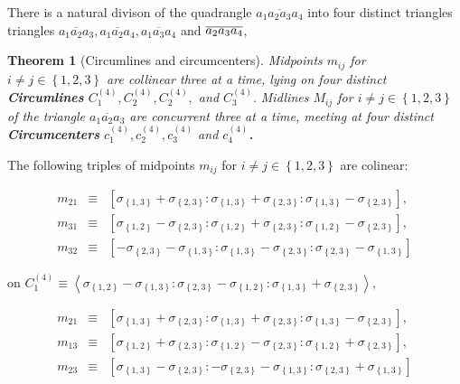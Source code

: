 \documentclass[11pt]{article}
\newtheorem{theorem}{Theorem}
\begin{document}
There is a natural divison of the quadrangle $\overline{a_{1}a_{2}a_{3}a_{4}}
$ into four distinct triangles triangles $\overline{a_{1}a_{2}a_{3}},%
\overline{a_{1}a_{2}a_{4}},\overline{a_{1}a_{3}a_{4}}$ and $\overline{%
a_{2}a_{3}a_{4}}$,

\begin{theorem}[Circumlines and circumcenters]
Midpoints $m_{ij}$ for $i\neq j\in \left\{ 1,2,3\right\} $ are collinear
three at a time, lying on four distinct \textbf{Circumlines} $C_{1}^{\left(
4\right) },C_{2}^{\left( 4\right) },C_{2}^{\left( 4\right) },$ and $%
C_{3}^{\left( 4\right) }.$ Midlines $M_{ij}$ for $i\neq j\in \left\{
1,2,3\right\} $ of the triangle $\overline{a_{1}a_{2}a_{3}}$ are concurrent
three at a time, meeting at four distinct \textbf{Circumcenters} $%
c_{1}^{\left( 4\right) },c_{2}^{\left( 4\right) },c_{3}^{\left( 4\right) }$
and $c_{4}^{\left( 4\right) }$\textbf{.}
\end{theorem}

The following triples of midpoints $m_{ij}$ for $i\neq j\in \left\{
1,2,3\right\} $ are colinear:

\begin{eqnarray*}
m_{21} &\equiv &\left[ \sigma _{\left\{ 1,3\right\} }+\sigma _{\left\{
2,3\right\} }:\sigma _{\left\{ 1,3\right\} }+\sigma _{\left\{ 2,3\right\}
}:\sigma _{\left\{ 1,3\right\} }-\sigma _{\left\{ 2,3\right\} }\right] , \\
m_{31} &\equiv &\left[ \sigma _{\left\{ 1,2\right\} }-\sigma _{\left\{
2,3\right\} }:\sigma _{\left\{ 1,2\right\} }+\sigma _{\left\{ 2,3\right\}
}:\sigma _{\left\{ 1,2\right\} }-\sigma _{\left\{ 2,3\right\} }\right] , \\
m_{32} &\equiv &\left[ -\sigma _{\left\{ 2,3\right\} }-\sigma _{\left\{
1,3\right\} }:\sigma _{\left\{ 1,3\right\} }-\sigma _{\left\{ 2,3\right\}
}:\sigma _{\left\{ 2,3\right\} }-\sigma _{\left\{ 1,3\right\} }\right] 
\end{eqnarray*}

on $C_{1}^{\left( 4\right) }\equiv \left\langle \sigma _{\left\{ 1,2\right\}
}-\sigma _{\left\{ 1,3\right\} }:\sigma _{\left\{ 2,3\right\} }-\sigma
_{\left\{ 1,2\right\} }:\sigma _{\left\{ 1,3\right\} }+\sigma _{\left\{
2,3\right\} }\right\rangle ,$

\begin{eqnarray*}
m_{21} &\equiv &\left[ \sigma _{\left\{ 1,3\right\} }+\sigma _{\left\{
2,3\right\} }:\sigma _{\left\{ 1,3\right\} }+\sigma _{\left\{ 2,3\right\}
}:\sigma _{\left\{ 1,3\right\} }-\sigma _{\left\{ 2,3\right\} }\right] , \\
m_{13} &\equiv &\left[ \sigma _{\left\{ 1,2\right\} }+\sigma _{\left\{
2,3\right\} }:\sigma _{\left\{ 1,2\right\} }-\sigma _{\left\{ 2,3\right\}
}:\sigma _{\left\{ 1,2\right\} }+\sigma _{\left\{ 2,3\right\} }\right] , \\
m_{23} &\equiv &\left[ \sigma _{\left\{ 1,3\right\} }-\sigma _{\left\{
2,3\right\} }:-\sigma _{\left\{ 2,3\right\} }-\sigma _{\left\{ 1,3\right\}
}:\sigma _{\left\{ 2,3\right\} }+\sigma _{\left\{ 1,3\right\} }\right] 
\end{eqnarray*}
\end{document}
